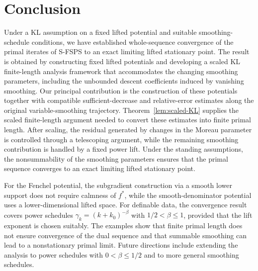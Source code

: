 \documentclass[9pt]{article}
\numberwithin{equation}{section}
\theoremstyle{definition}
\theoremstyle{remark}
\begin{document}
\section{Conclusion}\label{sec:conclusion}
Under a KL assumption on a fixed lifted potential and suitable
smoothing-schedule conditions, we have established whole-sequence
convergence of the primal iterates of S-FSPS to an exact limiting
lifted stationary point. The
result is obtained by constructing fixed lifted potentials and developing
a scaled KL finite-length analysis framework that accommodates the changing
smoothing parameters, including the unbounded descent coefficients
induced by vanishing smoothing. Our principal contribution is the
construction of these potentials together with compatible
sufficient-decrease and relative-error estimates along the original
variable-smoothing trajectory. Theorem~\ref{lem:scaled-KL} supplies the scaled finite-length
argument needed to convert these estimates into finite primal length.
After scaling, the residual generated by changes in the Moreau
parameter is controlled through a telescoping argument, while the
remaining smoothing contribution is handled by a fixed power lift.
Under the standing assumptions, the nonsummability of the smoothing
parameters ensures that the primal sequence converges to an exact limiting
lifted stationary point.

For the Fenchel potential, the subgradient construction via a smooth
lower support does not require calmness of $f^*$, while the
smooth-denominator potential uses a lower-dimensional lifted space.
For definable data, the convergence result covers power schedules
$\gamma_k=(k+k_0)^{-\beta}$ with $1/2<\beta\leq1$, provided that the
lift exponent is chosen suitably. The examples show that finite
primal length does not ensure convergence of the dual sequence and
that summable smoothing can lead to a nonstationary primal limit.
Future directions include extending the analysis to power schedules
with $0<\beta\leq1/2$ and to more general smoothing schedules.
\end{document}
